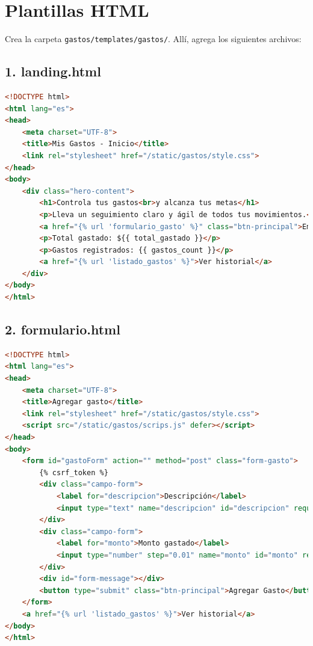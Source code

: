 \documentclass[12pt,a4paper]{article}
\begin{document}
\section{Plantillas HTML}

Crea la carpeta \texttt{gastos/templates/gastos/}. Allí, agrega los siguientes archivos:

\subsection{1. landing.html}
\begin{lstlisting}[language=HTML]
<!DOCTYPE html>
<html lang="es">
<head>
    <meta charset="UTF-8">
    <title>Mis Gastos - Inicio</title>
    <link rel="stylesheet" href="/static/gastos/style.css">
</head>
<body>
    <div class="hero-content">
        <h1>Controla tus gastos<br>y alcanza tus metas</h1>
        <p>Lleva un seguimiento claro y ágil de todos tus movimientos.</p>
        <a href="{% url 'formulario_gasto' %}" class="btn-principal">Empieza ahora</a>
        <p>Total gastado: ${{ total_gastado }}</p>
        <p>Gastos registrados: {{ gastos_count }}</p>
        <a href="{% url 'listado_gastos' %}">Ver historial</a>
    </div>
</body>
</html>
\end{lstlisting}

\subsection{2. formulario.html}
\begin{lstlisting}[language=HTML]
<!DOCTYPE html>
<html lang="es">
<head>
    <meta charset="UTF-8">
    <title>Agregar gasto</title>
    <link rel="stylesheet" href="/static/gastos/style.css">
    <script src="/static/gastos/scrips.js" defer></script>
</head>
<body>
    <form id="gastoForm" action="" method="post" class="form-gasto">
        {% csrf_token %}
        <div class="campo-form">
            <label for="descripcion">Descripción</label>
            <input type="text" name="descripcion" id="descripcion" required>
        </div>
        <div class="campo-form">
            <label for="monto">Monto gastado</label>
            <input type="number" step="0.01" name="monto" id="monto" required>
        </div>
        <div id="form-message"></div>
        <button type="submit" class="btn-principal">Agregar Gasto</button>
    </form>
    <a href="{% url 'listado_gastos' %}">Ver historial</a>
</body>
</html>
\end{lstlisting}
\end{document}

